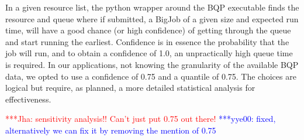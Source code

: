 \documentclass[conference,final]{IEEEtran}
\newcommand{\jhanote}[1]{ {\textcolor{red} { ***Jha: #1 }}}
\newcommand{\yyenote}[1]{ {\textcolor{blue} { ***yye00: #1 }}}
\newcommand{\jhanote}[1]{}
\newcommand{\yyenote}[1]{}
\begin{document}
In a given resource list, the python wrapper around the BQP executable
finds the resource and queue where if submitted, a BigJob of a
given size and expected run time, will have a good chance (or high
confidence) of getting through the queue and start running the
earliest. Confidence is in essence the probability that the job will
run, and to obtain a confidence of 1.0, an unpractically high queue time is
required. In our applications, not knowing the granularity of the
available BQP data, we opted to use a confidence of 0.75
and a quantile of 0.75. The choices are logical but require, as planned,
a more detailed statistical analysis for effectiveness.

\jhanote{sensitivity analysis!! Can't just put
  0.75 out there!}  \yyenote{fixed, alternatively we can fix it by removing
  the mention of 0.75}
 

\end{document}
